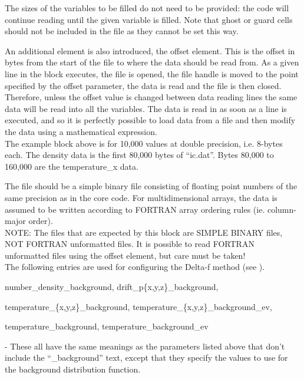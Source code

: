 The sizes of the variables to be filled do not need to be provided: the
code will continue reading until the given variable is filled.
Note that ghost or guard cells should not be included in the file as
they cannot be set this way.

An additional element is also introduced, the offset element. This
is the offset in bytes from the start of the file to where the data should
be read from. As a given line in the block executes, the file is opened, the
file handle is moved to the point specified by the offset parameter, the data
is read and the file is then closed. Therefore, unless the offset value is
changed between data reading lines the same data will be read into all the
variables. The data is read in as soon as a line is executed, and so it is
perfectly possible to load data from a file and then modify the data using
a mathematical expression.\\

The example block above is for 10,000 values at double precision, i.e. 8-bytes
each. The density data is the first 80,000 bytes of ``ic.dat''. Bytes 80,000
to 160,000 are the temperature\_x data.

The file should be a simple binary file consisting of floating point numbers of
the same precision as  in the core {\EPOCH} code. For
multidimensional arrays, the data is assumed to be written according to
FORTRAN array ordering rules (ie. column-major order).\\

{\emphtext NOTE: The files that are expected by this block are SIMPLE BINARY
files, NOT FORTRAN unformatted files. It is possible to read FORTRAN
unformatted files using the offset element, but care must be taken!}\\

The following entries are used for configuring the Delta-f method
(see ).\\

{\emphtext number\_density\_background, drift\_p\{x,y,z\}\_background,
\par temperature\_\{x,y,z\}\_background, temperature\_\{x,y,z\}\_background\_ev,
\par\vspace{3pt} temperature\_background, temperature\_background\_ev}
 - These all have the same
meanings as the parameters listed above that don't include the ``\_background''
text, except that they specify the values to use for the background distribution
function.\\

